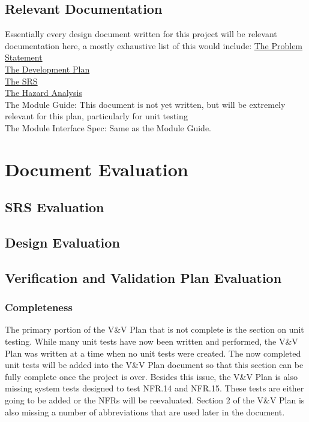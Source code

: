 \documentclass[12pt, titlepage]{article}
\begin{document}
\subsection{Relevant Documentation}

Essentially every design document written for this project will be relevant documentation here, a mostly exhaustive list of this would include:
\href{https://github.com/agentvv/MTOBridge/blob/main/docs/ProblemStatementAndGoals/ProblemStatement.pdf}{The Problem Statement}\\
\href{https://github.com/agentvv/MTOBridge/blob/main/docs/DevelopmentPlan/DevelopmentPlan.pdf}{The Development Plan}\\
\href{https://github.com/agentvv/MTOBridge/blob/main/docs/SRS/SRS.pdf}{The SRS}\\
\href{https://github.com/agentvv/MTOBridge/blob/main/docs/HazardAnalysis/HazardAnalysis.pdf}{The Hazard Analysis}\\
The Module Guide: This document is not yet written, but will be extremely relevant for this plan, particularly for unit testing\\
The Module Interface Spec: Same as the Module Guide.\\

\section{Document Evaluation}

\subsection{SRS Evaluation}

\subsection{Design Evaluation}

\subsection{Verification and Validation Plan Evaluation}

\subsubsection{Completeness}

The primary portion of the V\&V Plan that is not complete is the section on unit testing. While many unit tests have now been written and performed, the V\&V Plan was written at a time when no unit tests were created. The now completed unit tests will be added into the V\&V Plan document so that this section can be fully complete once the project is over. Besides this issue, the V\&V Plan is also missing system tests designed to test NFR.14 and NFR.15. These tests are either going to be added or the NFRs will be reevaluated. Section 2 of the V\&V Plan is also missing a number of abbreviations that are used later in the document.
\end{document}
